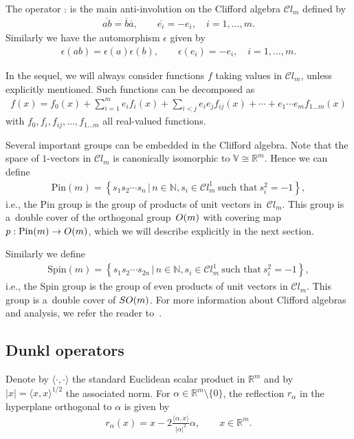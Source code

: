 \documentclass[11pt]{article}
\numberwithin{equation}{section}
\numberwithin{theorem}{section}
\numberwithin{proposition}{section}
\numberwithin{lemma}{section}
\numberwithin{corollary}{section}
\numberwithin{definition}{section}
\numberwithin{example}{section}
\numberwithin{remark}{section}
\numberwithin{note}{section}
\theoremstyle{remark}
\newcommand{\mR}{\mathbb{R}}
\newcommand{\mN}{\mathbb{N}}
\newcommand{\mV}{\mathbb{V}}
\newcommand{\cC}{\mathcal{C}}
\begin{document}
The operator $\bar{.}$ is the main anti-involution on the Clif\/ford algebra $\cC l_{m}$ def\/ined by
\begin{gather*}
\overline{a b}=\overline{b}\overline{a},\qquad\overline{e_{i}}=-e_{i},\quad i=1,\ldots,m.
\end{gather*}
Similarly we have the automorphism $\epsilon$ given by
\begin{gather*}
\epsilon(a b)=\epsilon(a)\epsilon(b),\qquad\epsilon(e_{i})=-e_{i},\quad i=1,\ldots,m.
\end{gather*}

In the sequel, we will always consider functions $f$ taking values in $\cC l_{m}$, unless
explicitly mentioned.
Such functions can be decomposed as
\begin{gather*}%
f(x)=f_{0}(x)+\sum_{i=1}^{m}e_{i}f_{i}(x)+\sum_{i<j}e_{i}e_{j}f_{ij}(x)+\cdots+e_{1}
\cdots e_{m}f_{1\ldots m}(x)
\end{gather*}
with $f_{0},f_{i},f_{ij},\ldots,f_{1\ldots m}$ all real-valued functions.

Several important groups can be embedded in the Clif\/ford algebra.
Note that the space of $1$-vectors in $\cC l_{m}$ is canonically isomorphic to $\mV\cong\mR^{m}$.
Hence we can def\/ine
\begin{gather*}
\mathrm{Pin}(m)=\left\{s_{1}s_{2}\cdots s_{n}\,|\,n\in\mN,s_{i}\in\cC l_{m}^{1}\ \text{such that}\ s_{i}^{2}=-1\right\},
\end{gather*}
i.e., the Pin group is the group of products of unit vectors in~$\cC l_{m}$.
This group is a~double cover of the orthogonal group~${\rm O}(m)$ with covering map $p:\mathrm{Pin}(m)
\rightarrow {\rm O}(m)$, which we will describe explicitly in the next section.

Similarly we def\/ine
\begin{gather*}
\mathrm{Spin}(m)=\left\{s_{1}s_{2}\cdots s_{2n}\,|\,n\in\mN,s_{i}\in\cC l_{m}^{1} \ \text{such that} \ s_{i}^{2}=-1\right\},
\end{gather*}
i.e., the Spin group is the group of even products of unit vectors in $\cC l_{m}$.
This group is a~double cover of ${\rm SO}(m)$.
For more information about Clif\/ford algebras and analysis, we refer the reader to~\cite{MR1169463,MR1130821}.

\subsection{Dunkl operators}\label{section2.2}
Denote by $\langle\cdot,\cdot
\rangle$ the standard Euclidean scalar product in $\mR^{m}$ and by $|x|=\langle x,
x\rangle^{1/2}$ the associated norm.
For $\alpha\in\mR^{m}\setminus \{0\}$, the ref\/lection $r_{\alpha}$ in the hyperplane orthogonal to
$\alpha$ is given by
\begin{gather*}
r_{\alpha}(x)=x-2\frac{\langle\alpha,x\rangle}{|\alpha|^{2}}\alpha,\qquad x\in\mR^{m}.
\end{gather*}
\end{document}
